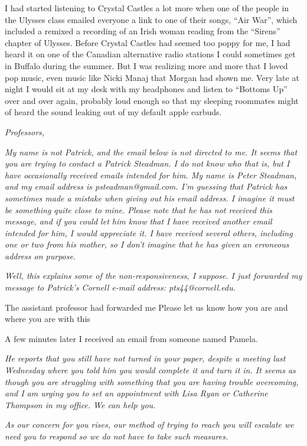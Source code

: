 I had started listening to Crystal Castles a lot more when one of the people in
the Ulysses class emailed everyone a link to one of their songs, ``Air War'',
which included a remixed a recording of an Irish woman reading from the
``Sirens'' chapter of Ulysses.  Before Crystal Castles had seemed too poppy for
me, I had heard it on one of the Canadian alternative radio stations I could
sometimes get in Buffalo during the summer.  But I was realizing more and more
that I loved pop music, even music like Nicki Manaj that Morgan had shown me.
Very late at night I would sit at my desk with my headphones and listen to
``Bottoms Up'' over and over again, probably loud enough so that my sleeping
roommates might of heard the sound leaking out of my default apple earbuds.


\textit{Professors,}

\textit{My name is not Patrick, and the email below is not directed to me.  It seems
that you are trying to contact a Patrick Steadman.  I do not know who that is,
but I have occasionally received emails intended for him.  My name is Peter
Steadman, and my email address is psteadman@gmail.com.  I'm guessing that
Patrick has sometimes made a mistake when giving out his email address.  I
imagine it must be something quite close to mine.  Please note that he has not
received this message, and if you could let him know that I have received
another email intended for him, I would appreciate it.  I have received
several others, including one or two from his mother, so I don't imagine that
he has given an erroneous address on purpose.
}

\textit{Well, this explains some of the non-responsiveness, I suppose.  I just
forwarded my message to Patrick's Cornell e-mail address:  pts44@cornell.edu.}


The assistant professor had forwarded me 
Please let us know how you are and where you are with this

A few minutes later I received an email from someone named Pamela.

\textit{
He reports that you still have not turned in your paper, despite a meeting last
Wednesday where you told him you would complete it and turn it in.  It seems as
though you are struggling with something that you are having trouble
overcoming, and I am urging you to set an appointment with Lisa Ryan or
Catherine Thompson in my office.  We can help you. }

\textit{
As our concern for you rises, our method of trying to reach you will escalate 
we need you to respond so we do not have to take such measures.}



